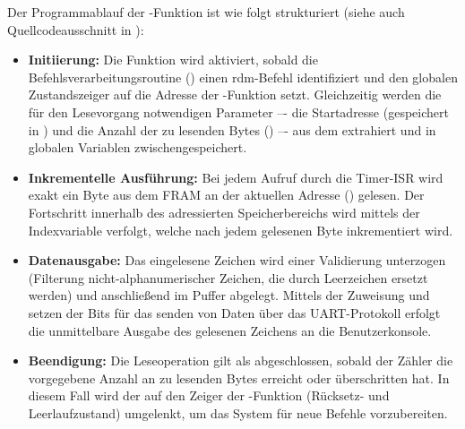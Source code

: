 Der Programmablauf der -Funktion ist wie folgt strukturiert (siehe auch Quellcodeausschnitt in ):
\begin{itemize}
	\item \textbf{Initiierung:} Die Funktion wird aktiviert, sobald die Befehlsverarbeitungsroutine () einen \grqq rdm\grqq-Befehl identifiziert und den globalen Zustandszeiger  auf die Adresse der -Funktion setzt. Gleichzeitig werden die f\"ur den Lesevorgang notwendigen Parameter –- die Startadresse (gespeichert in ) und die Anzahl der zu lesenden Bytes () –- aus dem  extrahiert und in globalen Variablen zwischengespeichert.
	
	\item \textbf{Inkrementelle Ausf\"uhrung:} Bei jedem Aufruf durch die Timer-ISR wird exakt ein Byte aus dem FRAM an der aktuellen Adresse () gelesen. Der Fortschritt innerhalb des adressierten Speicherbereichs wird mittels der Indexvariable  verfolgt, welche nach jedem gelesenen Byte inkrementiert wird.
	
	\item \textbf{Datenausgabe:} Das eingelesene Zeichen wird einer Validierung unterzogen (Filterung nicht-alphanumerischer Zeichen, die durch Leerzeichen ersetzt werden) und anschlie{\ss}end im Puffer  abgelegt. Mittels der Zuweisung \grq{}\grq und setzen der Bits f\"ur das senden von Daten \"uber das UART-Protokoll erfolgt die unmittelbare Ausgabe des gelesenen Zeichens an die Benutzerkonsole.
	
	\item \textbf{Beendigung:} Die Leseoperation gilt als abgeschlossen, sobald der Z\"ahler  die vorgegebene Anzahl an zu lesenden Bytes erreicht oder \"uberschritten hat. In diesem Fall wird der  auf den Zeiger der -Funktion (R\"ucksetz- und Leerlaufzustand) umgelenkt, um das System f\"ur neue Befehle vorzubereiten.
\end{itemize}

